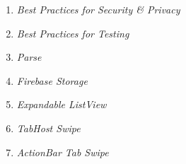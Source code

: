 \begin{enumerate}
		\item {\it Best Practices for Security \& Privacy}\cite{50:securityprivacity:online}
		\item {\it Best Practices for Testing}\cite{51:testing:online}
		\item {\it Parse}\cite{52:parse:online}
		\item {\it Firebase Storage}\cite{53:firebase:online}
		\item {\it Expandable ListView}\cite{54:expandable:online}
		\item {\it TabHost Swipe}\cite{55:tabhostswipe:online}
		\item {\it ActionBar Tab Swipe}\cite{56:actionbartab:online}
	\end{enumerate}